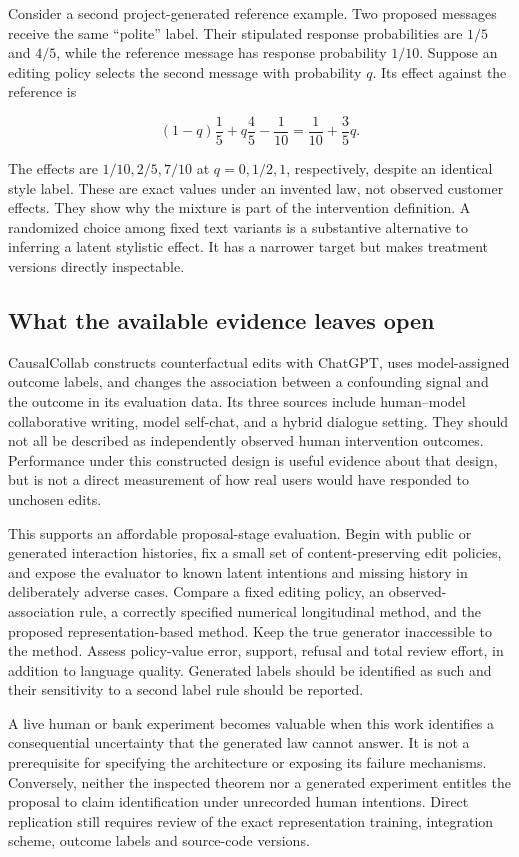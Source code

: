 Consider a second project-generated reference example. Two proposed
messages receive the same ``polite'' label. Their stipulated response
probabilities are \(1/5\) and \(4/5\), while the reference message has
response probability \(1/10\). Suppose an editing policy selects the
second message with probability \(q\). Its effect against the reference
is

\[
 (1-q)\frac15+q\frac45-\frac1{10}
 =\frac1{10}+\frac35q.
\]

The effects are \(1/10,2/5,7/10\) at \(q=0,1/2,1\), respectively,
despite an identical style label. These are exact values under an
invented law, not observed customer effects. They show why the mixture
is part of the intervention definition. A randomized choice among fixed
text variants is a substantive alternative to inferring a latent
stylistic effect. It has a narrower target but makes treatment versions
directly inspectable.

\hypertarget{what-the-available-evidence-leaves-open}{%
\subsection{What the available evidence leaves
open}\label{what-the-available-evidence-leaves-open}}

CausalCollab constructs counterfactual edits with ChatGPT, uses
model-assigned outcome labels, and changes the association between a
confounding signal and the outcome in its evaluation data. Its three
sources include human--model collaborative writing, model self-chat, and
a hybrid dialogue setting. They should not all be described as
independently observed human intervention outcomes. Performance under
this constructed design is useful evidence about that design, but is not
a direct measurement of how real users would have responded to unchosen
edits. \citep{exec13_census_collaboration}

This supports an affordable proposal-stage evaluation. Begin with public
or generated interaction histories, fix a small set of
content-preserving edit policies, and expose the evaluator to known
latent intentions and missing history in deliberately adverse cases.
Compare a fixed editing policy, an observed-association rule, a
correctly specified numerical longitudinal method, and the proposed
representation-based method. Keep the true generator inaccessible to the
method. Assess policy-value error, support, refusal and total review
effort, in addition to language quality. Generated labels should be
identified as such and their sensitivity to a second label rule should
be reported.

A live human or bank experiment becomes valuable when this work
identifies a consequential uncertainty that the generated law cannot
answer. It is not a prerequisite for specifying the architecture or
exposing its failure mechanisms. Conversely, neither the inspected
theorem nor a generated experiment entitles the proposal to claim
identification under unrecorded human intentions. Direct replication
still requires review of the exact representation training, integration
scheme, outcome labels and source-code versions.

\label{exec13:census-temporal-end}
